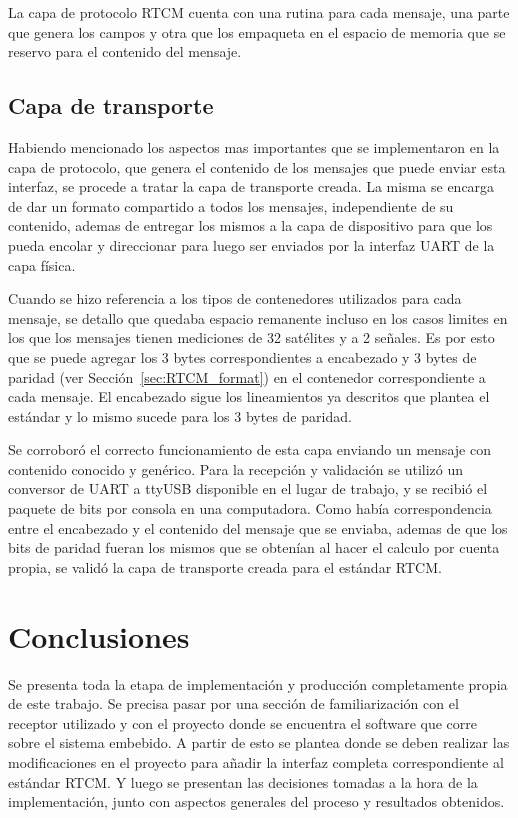 \documentclass[a4paper,12pt,oneside,onecolumn,final,openright]{book}%
\begin{document}
	La capa de protocolo RTCM cuenta con una rutina para cada mensaje, una parte que genera los campos y otra que los empaqueta en el espacio de memoria que se reservo para el contenido del mensaje. 
\subsection{Capa de transporte}
	Habiendo mencionado los aspectos mas importantes que se implementaron en la capa de protocolo, que genera el contenido de los mensajes que puede enviar esta interfaz, se procede a tratar la capa de transporte creada. La misma se encarga de dar un formato compartido a todos los mensajes, independiente de su contenido, ademas de entregar los mismos a la capa de dispositivo para que los pueda encolar y direccionar para luego ser enviados por la interfaz UART de la capa física.
	
	Cuando se hizo referencia a los tipos de contenedores utilizados para cada mensaje, se detallo que quedaba espacio remanente incluso en los casos limites en los que los mensajes tienen mediciones de 32 satélites y a 2 señales. Es por esto que se puede agregar los 3 bytes correspondientes a encabezado y 3 bytes de paridad (ver Sección~\ref{sec:RTCM_format}) en el contenedor correspondiente a cada mensaje. El encabezado sigue los lineamientos ya descritos que plantea el estándar y lo mismo sucede para los 3 bytes de paridad.
	
	Se corroboró el correcto funcionamiento de esta capa enviando un mensaje con contenido conocido y genérico. Para la recepción y validación se utilizó un conversor de UART a ttyUSB disponible en el lugar de trabajo, y se recibió el paquete de bits por consola en una computadora. Como había correspondencia entre el encabezado y el contenido del mensaje que se enviaba, ademas de que los bits de paridad fueran los mismos que se obtenían al hacer el calculo por cuenta propia, se validó la capa de transporte creada para el estándar RTCM.
\section{Conclusiones}
	Se presenta toda la etapa de implementación y producción completamente propia de este trabajo. Se precisa pasar por una sección de familiarización con el receptor utilizado y con el proyecto donde se encuentra el software que corre sobre el sistema embebido. A partir de esto se plantea donde se deben realizar las modificaciones en el proyecto para añadir la interfaz completa correspondiente al estándar RTCM. Y luego se presentan las decisiones tomadas a la hora de la implementación, junto con aspectos generales del proceso y resultados obtenidos. 
	
\end{document}
